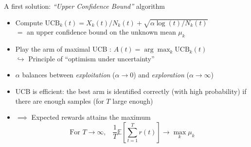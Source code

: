 \documentclass[11pt,english,ignorenonframetext,]{beamer}
\begin{document}
\begin{frame}{A first solution: \emph{``Upper Confidence Bound''} algorithm}

  \begin{itemize}
    \item
      Compute $\mathrm{UCB}_k(t) = X_k(t) / N_k(t) + \sqrt{\alpha \log(t) / N_k(t)}$\\
      $=$ an \alert{upper confidence bound} on the \alert{unknown} mean $\mu_k$
    \item
      Play the arm of maximal UCB : $A(t) = \arg\max_k \mathrm{UCB}_k(t)$
      \\
      $\hookrightarrow$ Principle of ``optimism under uncertainty''
    \item
      $\alpha$ balances between \emph{exploitation} ($\alpha\to0$) and \emph{exploration}  ($\alpha\to\infty$)

    \pause

    \item
      \alert{UCB is efficient}:
      the best arm is identified correctly (with high probability)
      if there are enough samples (for $T$ large enough)
    \item
      $\implies$
      Expected rewards attains the maximum \dLaughey{}
      \[ \text{For~} T\to\infty, \;\;\; \frac{1}{T} \mathbb{E}\left[ \sum\limits_{t=1}^T r(t) \right] \to \max_k \mu_k \]
  \end{itemize}
\end{frame}
\end{document}
